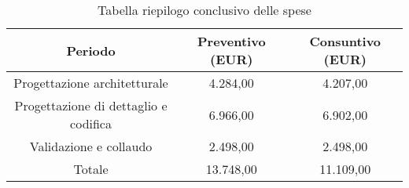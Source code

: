 \begin{table}[h]
	\caption{Tabella riepilogo conclusivo delle spese}  
	\begin{center}
		\begin{tabular}{ |c|c|c|  }
			\hline
			Periodo 								& Preventivo (EUR) & Consuntivo (EUR)\\
			\hline\hline
			Progettazione architetturale			& 4.284,00 				& 4.207,00\\
			Progettazione di dettaglio e codifica	& 6.966,00 			& 6.902,00\\
			Validazione e collaudo					& 2.498,00 			& 2.498,00\\
			\hline\hline
			Totale									& 13.748,00 				& 11.109,00 \\
			\hline
		\end{tabular}
	\end{center}
\end{table}